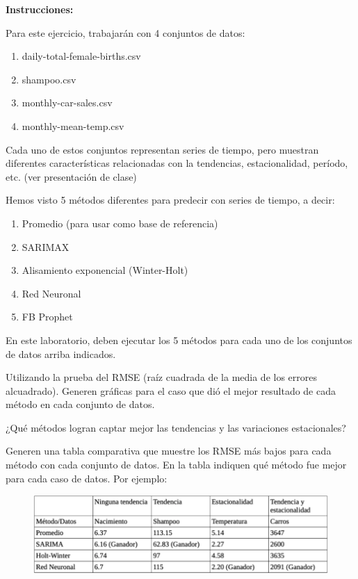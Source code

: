 





\textbf{Instrucciones:} 

Para este ejercicio, trabajarán con 4 conjuntos de datos:
\begin{enumerate}
	\item daily-total-female-births.csv
	\item shampoo.csv
	\item monthly-car-sales.csv
	\item monthly-mean-temp.csv
\end{enumerate}
Cada uno de estos conjuntos representan series de tiempo, pero muestran diferentes características relacionadas con la tendencias, estacionalidad, período, etc. (ver presentación de clase)

Hemos visto 5 métodos diferentes para predecir con series de tiempo, a decir:  
\begin{enumerate}
	\item Promedio (para usar como base de referencia)
	\item SARIMAX
	\item Alisamiento exponencial (Winter-Holt)
	\item Red Neuronal
	\item FB Prophet
\end{enumerate}

En este laboratorio, deben ejecutar los 5 métodos para cada uno de los conjuntos de datos arriba indicados.

\begin{problema}
	Utilizando la prueba del RMSE (raíz cuadrada de la media de los errores alcuadrado).  Generen gráficas para el caso que dió el mejor resultado de cada método en cada conjunto de datos.
\end{problema}

\begin{problema}
	¿Qué métodos logran captar mejor las tendencias y las variaciones estacionales?
\end{problema}

\begin{problema}
	Generen una tabla comparativa que muestre los RMSE más bajos para cada método con cada conjunto de datos. En la tabla indiquen qué método fue mejor para cada caso de datos.  Por ejemplo:
	\begin{figure}
		\centering
		\includegraphics[scale=0.5]{Images/1}
	\end{figure}
\end{problema}

